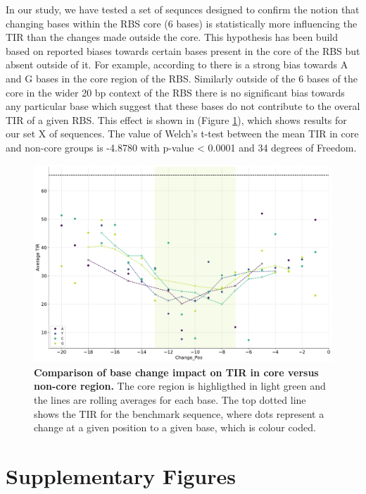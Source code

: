 In our study, we have tested a set of sequnces designed to confirm the notion that changing bases within the RBS core (6 bases) is statistically more influencing the TIR than the changes made outside the core.
This hypothesis has been build based on reported biases towards certain bases present in the core of the RBS but absent outside of it.
For example, according to \cite{SHULTZABERGER2001} there is a strong bias towards A and G bases in the core region of the RBS.
Similarly outside of the 6 bases of the core in the wider 20 bp context of the RBS there is no significant bias towards any particular base which suggest that these bases do not contribute to the overal TIR of a given RBS. 
This effect is shown in (Figure \ref{fig:core_vs_noncore}), which shows results for our set X of sequences.
The value of Welch's t-test between the mean TIR in core and non-core groups is -4.8780 with p-value < 0.0001 and 34 degrees of Freedom.

\begin{figure}[h]
    \centering
    \includegraphics[scale=0.4]{plots/Supplementary/core_vs_noncore.pdf}
    \caption{\textbf{Comparison of base change impact on TIR in core versus non-core region.} The core region is highligthed in light green and the lines are rolling averages for each base. The top dotted line shows the TIR for the benchmark sequence, where dots represent a change at a given position to a given base, which is colour coded.}
    \label{fig:core_vs_noncore}
\end{figure}

\section{Supplementary Figures}

